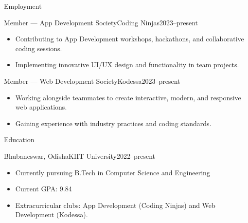 \documentclass[]{mcdowellcv}
\begin{document}
	\makeheader
	
	\begin{cvsection}{Employment}
		\begin{cvsubsection}{Member — App Development Society}{Coding Ninjas}{2023--present}
			\begin{itemize}
				\item Contributing to App Development workshops, hackathons, and collaborative coding sessions.
				\item Implementing innovative UI/UX design and functionality in team projects.
			\end{itemize}
		\end{cvsubsection}
		
		\begin{cvsubsection}{Member — Web Development Society}{Kodessa}{2023--present}
			\begin{itemize}
				\item Working alongside teammates to create interactive, modern, and responsive web applications.
				\item Gaining experience with industry practices and coding standards.
			\end{itemize}
		\end{cvsubsection}
	\end{cvsection}
	
	\begin{cvsection}{Education}
		\begin{cvsubsection}{Bhubaneswar, Odisha}{KIIT University}{2022--present}
			\begin{itemize}
				\item Currently pursuing B.Tech in Computer Science and Engineering
				\item Current GPA: 9.84
				\item Extracurricular clubs: App Development (Coding Ninjas) and Web Development (Kodessa).
			\end{itemize}
		\end{cvsubsection}
	\end{cvsection}
	
\end{document}
